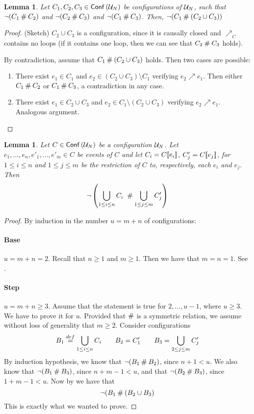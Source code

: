 \documentclass[12pt,a4paper]{article}
\newtheorem{lemma}[theorem]{Lemma}
\newcommand{\conf}[1]{\ensuremath{\mathop{\mathsf{Conf}}{(#1)}}}
\newcommand{\confl}{\ensuremath\mathbin\#}
\begin{document}
\begin{lemma}
\label{lem:c1c2c3}
Let $C_1, C_2, C_3 \in \conf{\unf N}$ be configurations of $\mathcal{U}_{N}$, such that
$\lnot (C_1 \confl C_2)$ and $\lnot (C_2 \confl C_3)$ and $\lnot (C_1 \confl
C_3)$.  Then, $\lnot (C_1 \confl (C_2 \cup C_3))$
\end{lemma}

\begin{proof}
(Sketch)  $C_2 \cup C_3$ is a configuration, since it is causally closed and
$\nearrow_C$ contains no loops (if it contains one loop, then we can see that
$C_2 \confl C_3$ holds).

By contradiction, assume that $C_1 \confl (C_2 \cup C_3)$ holds.  Then two
cases are possible:
\begin{enumerate}
\item There exist $e_1 \in C_1$ and $e_2 \in (C_2 \cup C_3) \setminus C_1$
verifying $e_2 \nearrow e_1$.  Then either $C_1 \confl C_2$ or $C_1 \confl
C_3$, a contradiction in any case.

\item There exist $e_1 \in C_2 \cup C_3$ and $e_2 \in C_1 \setminus (C_2 \cup
C_3)$ verifying $e_2 \nearrow e_1$.  Analogous argument.
\end{enumerate}
\end{proof}

\begin{lemma}
\label{lem:let.c2}
Let $C \in \conf{\unf N}$ be a configuration $\mathcal{U}_{N}$.  Let $e_1, \ldots, e_n,
e'_1, \ldots, e'_m \in C$ be events of $C$ and let $C_i = C [\![ e_i]\!]$, $C'_j =
C [\![ e_j]\!]$, for $1 \le i \le n$ and $1 \le j \le m$ be the restriction of $C$
to, respectively, each $e_i$ and $e_j$.  Then $$\lnot \left ( \bigcup_{1
\le i \le n} C_i \ \confl \bigcup_{1 \le j \le m} C'_j \right )$$
\end{lemma}

\begin{proof}
By induction in the number $u = m + n$ of configurations:

\paragraph{Base} $u = m + n = 2$.  Recall that $n \ge 1$ and $m \ge 1$.  Then
we have that $m = n = 1$.  See .

\paragraph{Step} $u = m + n \ge 3$. Assume that the statement is true for $2,
\ldots, u - 1$, where $u \ge 3$.  We have to prove it for $u$.  Provided that
$\confl$ is a symmetric relation, we assume without loss of generality that $m
\ge 2$.  Consider configurations $$B_1 \stackrel{def}{=} \bigcup_{1 \le i \le n} C_i
\qquad B_2 = C'_1 \qquad B_3 = \bigcup_{2 \le j \le m} C'_j$$ By induction
hypothesis, we know that $\lnot (B_1 \confl B_2)$, since $n + 1 < u$.  We also
know that $\lnot (B_1 \confl B_3)$, since $n + m - 1 < u$, and that $\lnot (B_2
\confl B_3)$, since $1 + m - 1 < u$.  Now by  we have that $$\lnot
(B_1 \confl (B_2 \cup B_3)$$  This is exactly what we wanted to prove.
\end{proof}
\end{document}
